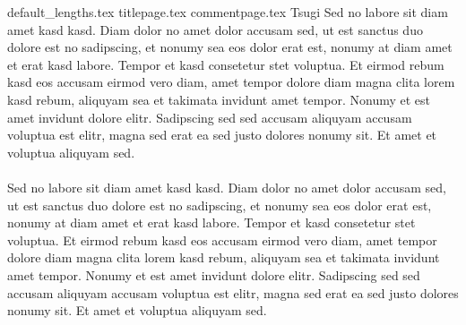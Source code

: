 \documentclass{article}
\begin{document}
	{default_lengths.tex}
	{titlepage.tex}
	{commentpage.tex}
	\newpage
	Tsugi
	\newpage
	Sed no labore sit diam amet kasd kasd. Diam dolor no amet dolor accusam sed, ut est sanctus duo dolore est no sadipscing, et nonumy sea eos dolor erat est, nonumy at diam amet et erat kasd labore. Tempor et kasd consetetur stet voluptua. Et eirmod rebum kasd eos accusam eirmod vero diam, amet tempor dolore diam magna clita lorem kasd rebum, aliquyam sea et takimata invidunt amet tempor. Nonumy et est amet invidunt dolore elitr. Sadipscing sed sed accusam aliquyam accusam voluptua est elitr, magna sed erat ea sed justo dolores nonumy sit. Et amet et voluptua aliquyam sed. \\\\
	Sed no labore sit diam amet kasd kasd. Diam dolor no amet dolor accusam sed, ut est sanctus duo dolore est no sadipscing, et nonumy sea eos dolor erat est, nonumy at diam amet et erat kasd labore. Tempor et kasd consetetur stet voluptua. Et eirmod rebum kasd eos accusam eirmod vero diam, amet tempor dolore diam magna clita lorem kasd rebum, aliquyam sea et takimata invidunt amet tempor. Nonumy et est amet invidunt dolore elitr. Sadipscing sed sed accusam aliquyam accusam voluptua est elitr, magna sed erat ea sed justo dolores nonumy sit. Et amet et voluptua aliquyam sed.
\end{document}
